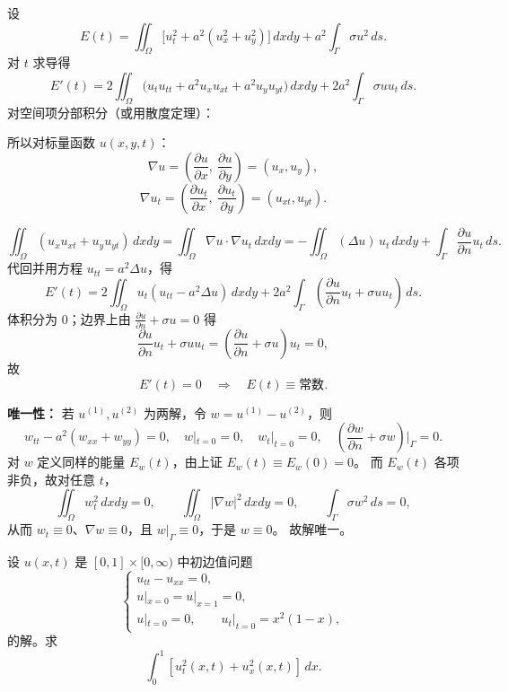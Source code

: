 \begin{solution}
设
\[
E(t)=\iint_{\Omega}\bigl[u_t^2+a^2(u_x^2+u_y^2)\bigr]\,dxdy+a^2\int_{\Gamma}\sigma u^2\,ds.
\]
对 $t$ 求导得
\[
E'(t)=2\iint_{\Omega}\bigl(u_tu_{tt}+a^2u_xu_{xt}+a^2u_yu_{yt}\bigr)\,dxdy
+2a^2\int_{\Gamma}\sigma uu_t\,ds.
\]
对空间项分部积分（或用散度定理）：
\begin{dxtips}
    所以对标量函数 $u(x,y,t)$：
\[
\nabla u=\left(\frac{\partial u}{\partial x},\ \frac{\partial u}{\partial y}\right)=(u_x,u_y),
\]
\[
\nabla u_t=\left(\frac{\partial u_t}{\partial x},\ \frac{\partial u_t}{\partial y}\right)=(u_{xt},u_{yt}).
\]
\end{dxtips}
\[
\iint_{\Omega}(u_xu_{xt}+u_yu_{yt})\,dxdy
=\iint_{\Omega}\nabla u\cdot\nabla u_t\,dxdy
=-\iint_{\Omega}(\Delta u)\,u_t\,dxdy+\int_{\Gamma}\frac{\partial u}{\partial n}u_t\,ds.
\]
代回并用方程 $u_{tt}=a^2\Delta u$，得
\[
E'(t)=2\iint_{\Omega}u_t(u_{tt}-a^2\Delta u)\,dxdy
+2a^2\int_{\Gamma}\left(\frac{\partial u}{\partial n}u_t+\sigma uu_t\right)\,ds.
\]
体积分为 $0$；边界上由 $\frac{\partial u}{\partial n}+\sigma u=0$ 得
\[
\frac{\partial u}{\partial n}u_t+\sigma uu_t=\left(\frac{\partial u}{\partial n}+\sigma u\right)u_t=0,
\]
故
\[
E'(t)=0\quad\Rightarrow\quad E(t)\equiv \text{常数}.
\]

\medskip
\noindent\textbf{唯一性：}
若 $u^{(1)},u^{(2)}$ 为两解，令 $w=u^{(1)}-u^{(2)}$，则
\[
w_{tt}-a^2(w_{xx}+w_{yy})=0,\quad w|_{t=0}=0,\quad w_t|_{t=0}=0,\quad
\left(\frac{\partial w}{\partial n}+\sigma w\right)\Big|_{\Gamma}=0.
\]
对 $w$ 定义同样的能量 $E_w(t)$，由上证 $E_w(t)\equiv E_w(0)=0$。
而 $E_w(t)$ 各项非负，故对任意 $t$，
\[
\iint_{\Omega}w_t^2\,dxdy=0,\qquad \iint_{\Omega}|\nabla w|^2\,dxdy=0,\qquad \int_{\Gamma}\sigma w^2\,ds=0,
\]
从而 $w_t\equiv0$、$\nabla w\equiv0$，且 $w|_{\Gamma}\equiv0$，于是 $w\equiv0$。
故解唯一。
\end{solution}
\begin{homework}[7]
设 $u(x,t)$ 是 $[0,1]\times[0,\infty)$ 中初边值问题
\[
\begin{cases}
u_{tt}-u_{xx}=0,\\[4pt]
u|_{x=0}=u|_{x=1}=0,\\[4pt]
u|_{t=0}=0,\qquad u_t|_{t=0}=x^{2}(1-x),
\end{cases}
\]
的解。求
\[
\int_{0}^{1}\left[u_t^{2}(x,t)+u_x^{2}(x,t)\right]\,dx.
\]
\end{homework}

